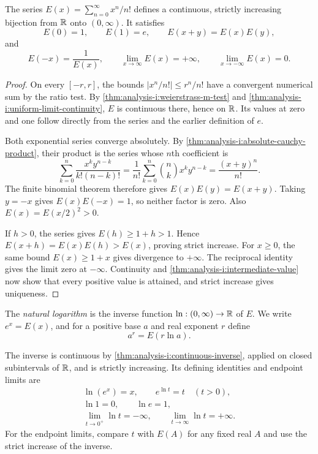 \begin{theorem}
  \label{thm:analysis-i:exponential-properties}
  The series $E(x)=\sum_{n=0}^{\infty}x^n/n!$ defines a continuous,
  strictly increasing bijection from $\mathbb{R}$ onto $(0,\infty)$. It satisfies
  \[
    E(0)=1,\qquad E(1)=e,\qquad E(x+y)=E(x)E(y),
  \]
  and
  \[
    E(-x)=\frac1{E(x)},\qquad
    \lim_{x\to\infty}E(x)=+\infty,\qquad
    \lim_{x\to-\infty}E(x)=0.
  \]
\end{theorem}
\begin{proof}
  On every $[-r,r]$, the bounds $|x^n/n!|\le r^n/n!$ have a
  convergent numerical sum by the ratio test. By
  \autoref{thm:analysis-i:weierstrass-m-test} and
  \autoref{thm:analysis-i:uniform-limit-continuity}, $E$ is
  continuous there, hence on $\mathbb{R}$. Its values at zero and one follow
  directly from the series and the earlier definition of $e$.

  Both exponential series converge absolutely. By
  \autoref{thm:analysis-i:absolute-cauchy-product}, their product is
  the series whose $n$th coefficient is
  \[
    \sum_{k=0}^{n}\frac{x^ky^{n-k}}{k!(n-k)!}
      =\frac1{n!}\sum_{k=0}^{n}\binom nk x^ky^{n-k}
      =\frac{(x+y)^n}{n!}.
  \]
  The finite binomial theorem therefore gives $E(x)E(y)=E(x+y)$.
  Taking $y=-x$ gives $E(x)E(-x)=1$, so neither factor is zero.
  Also $E(x)=E(x/2)^2>0$.

  If $h>0$, the series gives $E(h)\ge1+h>1$. Hence
  $E(x+h)=E(x)E(h)>E(x)$, proving strict increase.
  For $x\ge0$, the same bound $E(x)\ge1+x$ gives divergence to
  $+\infty$. The reciprocal identity gives the limit zero at
  $-\infty$. Continuity and \autoref{thm:analysis-i:intermediate-value}
  now show that every positive value is attained, and strict increase
  gives uniqueness.
\end{proof}

\begin{definition}
  \label{thm:analysis-i:logarithm-real-powers}
  The \emph{natural logarithm} is the inverse function
  $\ln:(0,\infty)\to\mathbb{R}$ of $E$. We write $e^x=E(x)$, and for a
  positive base $a$ and real exponent $r$ define
  \[
    a^r=E(r\ln a).
  \]
\end{definition}
The inverse is continuous by
\autoref{thm:analysis-i:continuous-inverse}, applied on closed
subintervals of $\mathbb{R}$, and is strictly increasing. Its defining identities
and endpoint limits are
\[
  \begin{gathered}
    \ln(e^x)=x,\qquad e^{\ln t}=t\quad(t>0),\\
    \ln1=0,\qquad \ln e=1,\\
    \lim_{t\to0^+}\ln t=-\infty,\qquad
    \lim_{t\to\infty}\ln t=+\infty.
  \end{gathered}
\]
For the endpoint limits, compare $t$ with $E(A)$ for any fixed real
$A$ and use the strict increase of the inverse.

